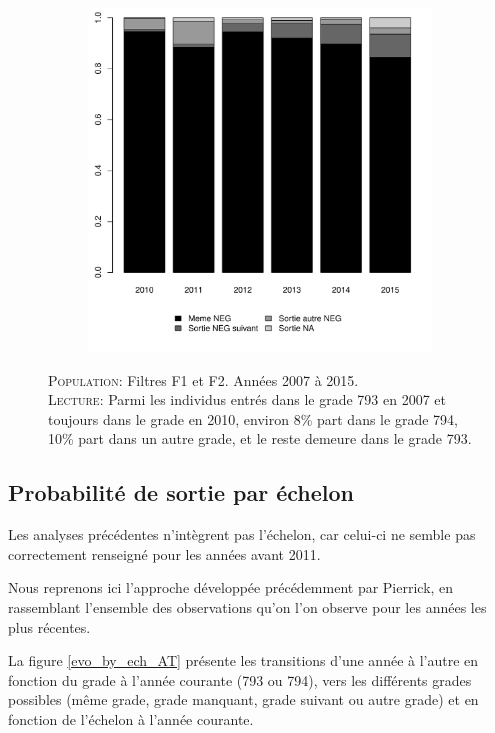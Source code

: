 \documentclass[11pt,a4paper]{article}
\begin{document}
\begin{figure}[ht]
\begin{subfigure}[b]{0.5\linewidth}
    \includegraphics[width=1\linewidth]{AT_destination_2009.pdf}  
    \end{subfigure}
    \begin{minipage}{12cm}
\footnotesize
\textsc{Population:} Filtres F1 et F2. Années 2007 à 2015. \\
\textsc{Lecture:} Parmi les individus entrés dans le grade 793 en 2007 et toujours dans le grade en 2010, environ 8\% part dans le grade 794, 10\% part dans un autre grade,  et le reste demeure dans le grade 793. 
\end{minipage}
\end{figure}




\clearpage
\subsection{Probabilité de sortie par échelon}

Les analyses précédentes n'intègrent pas l'échelon, car celui-ci ne semble pas correctement renseigné pour les années avant 2011.

Nous reprenons ici l'approche développée précédemment par Pierrick, en rassemblant l'ensemble des observations qu'on l'on observe pour les années les plus récentes. 

La figure \ref{evo_by_ech_AT} présente les transitions d'une année à l'autre en fonction du grade à l'année courante (793 ou 794), vers les différents grades possibles (même grade, grade manquant, grade suivant ou autre grade) et en fonction de l'échelon à l'année courante. 
\end{document}

